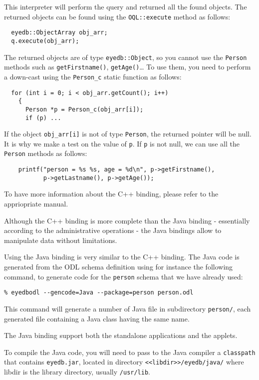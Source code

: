 This interpreter will perform the query and returned all the found objects.
The returned objects can be found using the \texttt{OQL::execute} method
as follows:
\verbsize \begin{verbatim}
  eyedb::ObjectArray obj_arr;
  q.execute(obj_arr);
\end{verbatim}
\normalsize

The returned objects are of type \texttt{eyedb::Object}, so you cannot use the
\texttt{Person} methods such as \texttt{getFirstname()}, \texttt{getAge()}\ldots
To use them, you need to perform a down-cast using the \texttt{Person\_c} static
function as follows:
\verbsize \begin{verbatim}
  for (int i = 0; i < obj_arr.getCount(); i++)
    {
      Person *p = Person_c(obj_arr[i]);
      if (p) ...
\end{verbatim}
\normalsize
If the object \texttt{obj\_arr[i]} is not of type \texttt{Person}, the returned
pointer will be null. It is why we make a test on the value of \texttt{p}.
If \texttt{p} is not null, we can use all the \texttt{Person} methods as follows:
\verbsize \begin{verbatim}
    printf("person = %
           p->getLastname(), p->getAge());
\end{verbatim}
\normalsize

To have more information about the C++ binding, please refer to the
appriopriate manual.



Although the C++ binding is more complete than the Java binding
- essentially according to the administrative operations - the Java
bindings allow to manipulate data without limitations.

Using the Java binding is very similar to the C++ binding. The Java code is 
generated from the ODL schema definition using for instance the following command, to generate
code for the \texttt{person} schema that we have already used:
\verbsize \begin{verbatim}
% eyedbodl --gencode=Java --package=person person.odl
\end{verbatim}
\normalsize
This command will generate a number of Java file in subdirectory \texttt{person/},
each generated file containing a Java class having the same name.

The Java binding support both the standalone applications and the applets.

To compile the Java code, you will need to pass to the Java compiler a \texttt{classpath}
that contains \texttt{eyedb.jar}, located in directory \texttt{<<libdir>>/eyedb/java/} where
libdir is the library directory, usually \texttt{/usr/lib}.

